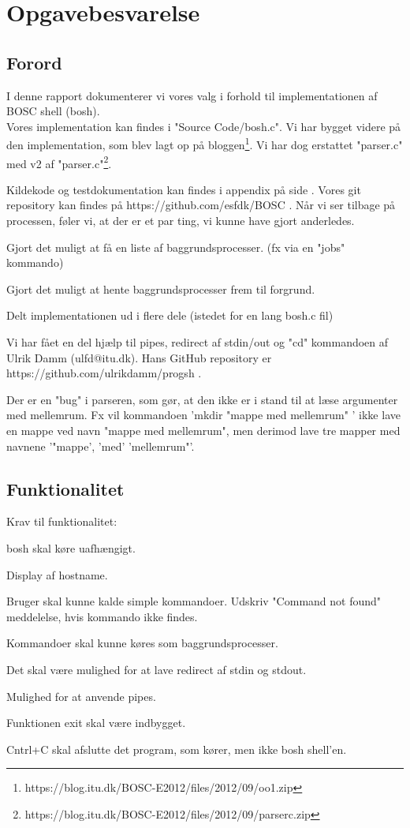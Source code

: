 \chapter{Opgavebesvarelse}
\section{Forord}
I denne rapport dokumenterer vi vores valg i forhold til implementationen af BOSC shell (bosh). 
\\Vores implementation kan findes i "Source Code/bosh.c". Vi har bygget videre på den implementation, som blev lagt op på bloggen\footnote{https://blog.itu.dk/BOSC-E2012/files/2012/09/oo1.zip}. Vi har dog erstattet "parser.c" med v2 af  "parser.c"\footnote{ https://blog.itu.dk/BOSC-E2012/files/2012/09/parserc.zip}.

Kildekode og testdokumentation kan findes i appendix på side \pageref{Appendix}. Vores git repository kan findes på https://github.com/esfdk/BOSC .
Når vi ser tilbage på processen, føler vi, at der er et par ting, vi kunne have gjort anderledes.
\begin{my_itemize}
\item Gjort det muligt at få en liste af baggrundsprocesser. (fx via en "jobs" kommando)
\item Gjort det muligt at hente baggrundsprocesser frem til forgrund.
\item Delt implementationen ud i flere dele (istedet for en lang bosh.c fil)
\end{my_itemize}

Vi har fået en del hjælp til pipes, redirect af stdin/out og "cd" kommandoen af Ulrik Damm (ulfd@itu.dk). Hans GitHub repository er https://github.com/ulrikdamm/progsh .

Der er en "bug" i parseren, som gør, at den ikke er i stand til at læse argumenter med mellemrum. Fx vil kommandoen 'mkdir "mappe med mellemrum" ' ikke lave en mappe ved navn "mappe med mellemrum", men derimod lave tre mapper med navnene '"mappe', 'med' 'mellemrum"'.

\section{Funktionalitet}
Krav til funktionalitet:
\begin{my_enumerate}
\item bosh skal køre uafhængigt.
\item Display af hostname.
\item Bruger skal kunne kalde simple kommandoer. Udskriv "Command not found" meddelelse, hvis kommando ikke findes.
\item Kommandoer skal kunne køres som baggrundsprocesser.
\item Det skal være mulighed for at lave redirect af stdin og stdout.
\item Mulighed for at anvende pipes.
\item Funktionen exit skal være indbygget.
\item Cntrl+C skal afslutte det program, som kører, men ikke bosh shell'en.
\end{my_enumerate}

